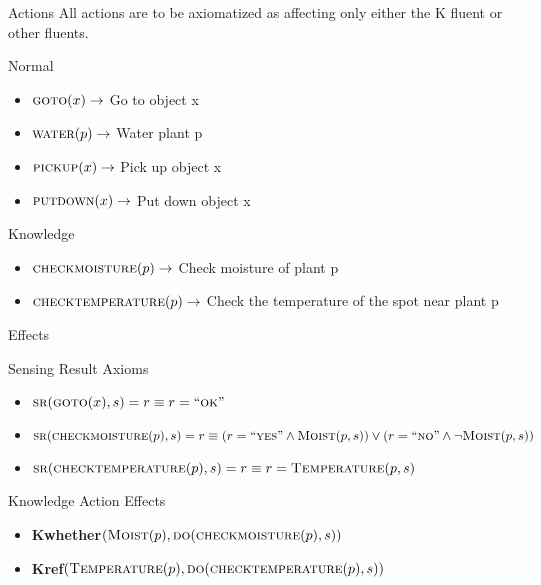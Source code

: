 \begin{frame}{Actions}
    \vspace*{-0.5cm}
    All actions are to be axiomatized as affecting only either the K fluent or other fluents.
    \begin{block}{Normal}
        \begin{itemize}
            \item $\textsc{goto}(x) \rightarrow$ Go to object x
            \item $\textsc{water}(p) \rightarrow$ Water plant p
            \item $\textsc{pickup}(x) \rightarrow$ Pick up object x
            \item $\textsc{putdown}(x) \rightarrow$ Put down object x
        \end{itemize}
    \end{block}
    \begin{block}{Knowledge}
        \begin{itemize}
            \item $\textsc{checkmoisture}(p) \rightarrow$ Check moisture of plant p
            \item $\textsc{checktemperature}(p) \rightarrow$ Check the temperature of the spot near plant p
        \end{itemize}
    \end{block}
\end{frame}

\begin{frame}{Effects}
    \vspace*{-0.5cm}
    \begin{block}{Sensing Result Axioms}
        \begin{itemize}
            \item $\textsc{sr}(\textsc{goto}(x),s) = r\equiv r = ``\textsc{ok}"$
            \item $\textsc{sr}(\textsc{checkmoisture}(p),s) = r \equiv (r = ``\textsc{yes}" \land \textsc{Moist}(p,s)) \lor (r = ``\textsc{no}" \land \neg \textsc{Moist}(p,s))$
            \item $\textsc{sr}(\textsc{checktemperature}(p),s) = r \equiv r = \textsc{Temperature}(p,s)$
        \end{itemize}
    \end{block}
    \begin{block}{Knowledge Action Effects}
        \begin{itemize}
            \item \textbf{Kwhether}$(\textsc{Moist}(p), \textsc{do}(\textsc{checkmoisture}(p),s))$
            \item \textbf{Kref}$(\textsc{Temperature}(p), \textsc{do}(\textsc{checktemperature}(p),s))$
        \end{itemize}
    \end{block}
\end{frame}

